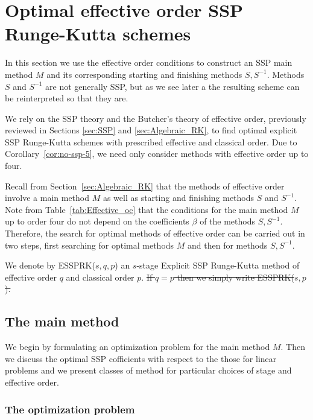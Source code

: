 \section{Optimal effective order SSP Runge-Kutta schemes}\label{sec:Optimal_ESSPRK}
In this section we use the effective order conditions to
construct an SSP main method $M$ and its corresponding starting and finishing
methods $S,S^{-1}$.  Methods $S$ and $S^{-1}$ are not generally SSP, but as we see later a the resulting scheme can be reinterpreted so that they are.

We rely on the SSP theory and the Butcher's theory of effective order,
previously reviewed in Sections \ref{sec:SSP} and \ref{sec:Algebraic_RK}, to
find optimal explicit SSP Runge-Kutta schemes with prescribed effective and classical order.  Due to Corollary~\ref{cor:no-ssp-5}, we need only consider methods with effective order 
up to four.

Recall from Section~\ref{sec:Algebraic_RK} that the methods of effective order involve
a main method $M$ as well as starting and finishing methods $S$ and $S^{-1}$.
Note from Table~\ref{tab:Effective_oc} that the conditions for the main method $M$
up to order four do not depend on the coefficients $\beta$ of the methods $S,S^{-1}$. 
Therefore, the search for optimal methods of effective order can be carried out in
two steps, first searching for optimal methods $M$ and then for methods $S,S^{-1}$.


We denote by ESSPRK($s,q,p$) an $s$-stage Explicit SSP Runge-Kutta method of
effective order $q$ and classical order $p$.
\sout{If $q=p$ then we simply write ESSPRK($s,p$).}

\subsection{The main method}\label{subsection3.1}

We begin by formulating an optimization problem for the main method $M$. Then we discuss 
the optimal SSP cofficients with respect to the those for linear problems and we present classes of method for particular choices of stage and effective order.

\subsubsection{The optimization problem\label{subsection3.1.1}}

